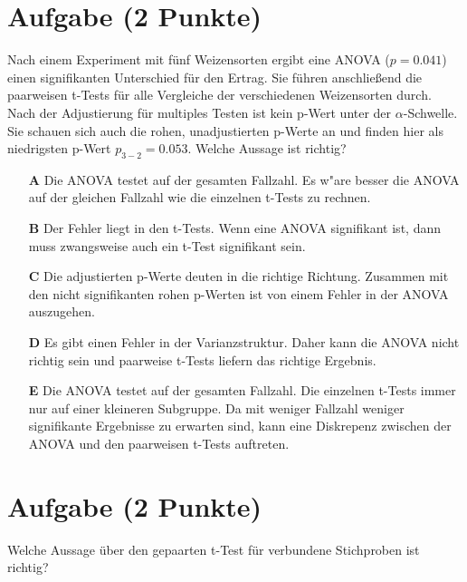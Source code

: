 \documentclass[a4paper, 10pt]{scrartcl}\usepackage[]{graphicx}\usepackage[]{xcolor}
\begin{document}
\section{Aufgabe \hfill (2 Punkte)}

Nach einem Experiment mit f{\"u}nf Weizensorten ergibt eine ANOVA ($p = 0.041$)
einen signifikanten Unterschied f{\"u}r den Ertrag. Sie f{\"u}hren anschlie{\ss}end die
paarweisen t-Tests f{\"u}r alle Vergleiche der verschiedenen Weizensorten
durch. Nach der Adjustierung f{\"u}r multiples Testen ist kein p-Wert unter der
$\alpha$-Schwelle. Sie schauen sich auch die rohen, unadjustierten p-Werte
an und finden hier als niedrigsten p-Wert $p_{3-2} = 0.053$. Welche Aussage
ist richtig? 



\begin{enumerate}
\item [\textbf{A} \msquare] Die ANOVA testet auf der gesamten Fallzahl. Es w{"a}re besser die ANOVA auf der gleichen Fallzahl wie die einzelnen t-Tests zu rechnen.
\item [\textbf{B} \msquare] Der Fehler liegt in den t-Tests. Wenn eine ANOVA signifikant ist, dann muss zwangsweise auch ein t-Test signifikant sein.
\item [\textbf{C} \msquare] Die adjustierten p-Werte deuten in die richtige Richtung. Zusammen mit den nicht signifikanten rohen p-Werten ist von einem Fehler in der ANOVA auszugehen.
\item [\textbf{D} \msquare] Es gibt einen Fehler in der Varianzstruktur. Daher kann die ANOVA nicht richtig sein und paarweise t-Tests liefern das richtige Ergebnis.
\item [\textbf{E} \msquare] Die ANOVA testet auf der gesamten Fallzahl. Die einzelnen t-Tests immer nur auf einer kleineren Subgruppe. Da mit weniger Fallzahl weniger signifikante Ergebnisse zu erwarten sind, kann eine Diskrepenz zwischen der ANOVA und den paarweisen t-Tests auftreten.
\end{enumerate}

\section{Aufgabe \hfill (2 Punkte)}

Welche Aussage {\"u}ber den gepaarten t-Test f{\"u}r verbundene Stichproben ist richtig?
\end{document}
